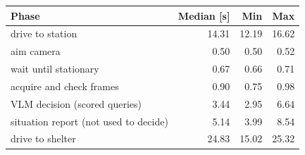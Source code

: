 \begin{tabular}{lrrr}
\toprule
Phase & Median [s] & Min & Max \\
\midrule
drive to station & 14.31 & 12.19 & 16.62 \\
aim camera & 0.50 & 0.50 & 0.52 \\
wait until stationary & 0.67 & 0.66 & 0.71 \\
acquire and check frames & 0.90 & 0.75 & 0.98 \\
VLM decision (scored queries) & 3.44 & 2.95 & 6.64 \\
situation report (not used to decide) & 5.14 & 3.99 & 8.54 \\
drive to shelter & 24.83 & 15.02 & 25.32 \\
\bottomrule
\end{tabular}
